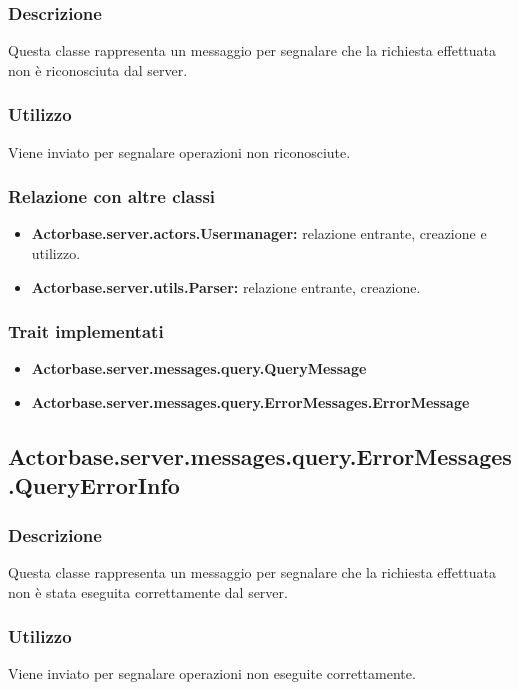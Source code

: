 \documentclass[a4paper]{article}
\begin{document}
			\subsubsection{Descrizione}
				Questa classe rappresenta un messaggio per segnalare che la richiesta effettuata non è riconosciuta dal server.
				
			\subsubsection{Utilizzo}
				Viene inviato per segnalare operazioni non riconosciute.
				
			\subsubsection{Relazione con altre classi}
				\begin{itemize}
					\item \textbf{Actorbase.server.actors.Usermanager:} relazione entrante, creazione e utilizzo.
					\item \textbf{Actorbase.server.utils.Parser:} relazione entrante, creazione.
				\end{itemize}
			
			\subsubsection{Trait implementati}
				\begin{itemize}
					\item \textbf{Actorbase.server.messages.query.QueryMessage}
					\item \textbf{Actorbase.server.messages.query.ErrorMessages.ErrorMessage} 
				\end{itemize}
				
			\subsection{Actorbase.server.messages.query.ErrorMessages.QueryErrorInfo}
			\subsubsection{Descrizione}
				Questa classe rappresenta un messaggio per segnalare che la richiesta effettuata non è stata eseguita correttamente dal server.
				
			\subsubsection{Utilizzo}
				Viene inviato per segnalare operazioni non eseguite correttamente.
				
\end{document}
